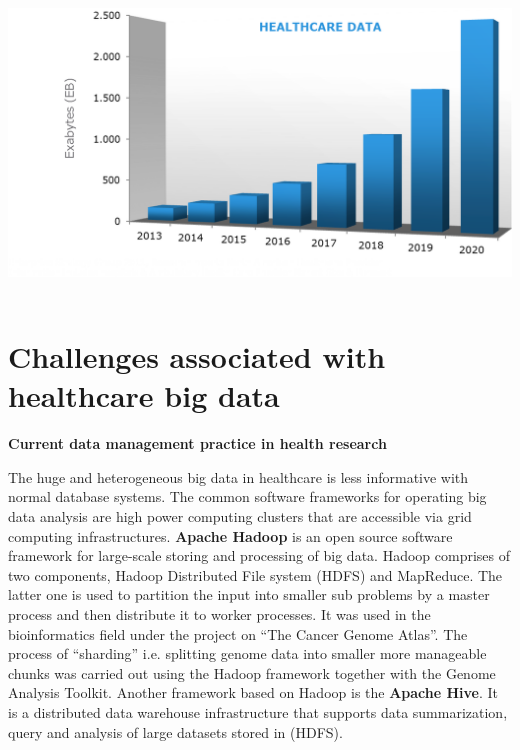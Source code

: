 \documentclass[10pt,a4paper,twoside]{article}
\begin{document}
\begin{center}
    \includegraphics[width=15cm, height=8cm]{healthcaredata} \\[\baselineskip]
\end{center}

\section*{Challenges associated with healthcare big data }
\textbf{Current data management practice in health research }

The huge and heterogeneous big data in healthcare is less informative with normal database systems. The common software frameworks for operating big data analysis are high power computing clusters that are accessible via grid computing infrastructures. \textbf{Apache Hadoop} is an open source software framework for large-scale storing and processing of big data. Hadoop comprises of two components, Hadoop Distributed File system (HDFS) and MapReduce. The latter one is used to partition the input into smaller sub problems by a master process and then distribute it to worker processes. It was used in the bioinformatics field under the project on “The Cancer Genome Atlas”. The process of “sharding” i.e. splitting genome data into smaller more manageable chunks was carried out using the Hadoop framework together with the Genome Analysis Toolkit. Another framework based on Hadoop is the \textbf{Apache Hive}. It is a distributed data warehouse infrastructure that supports data summarization, query and analysis of large datasets stored in (HDFS).
\end{document}

